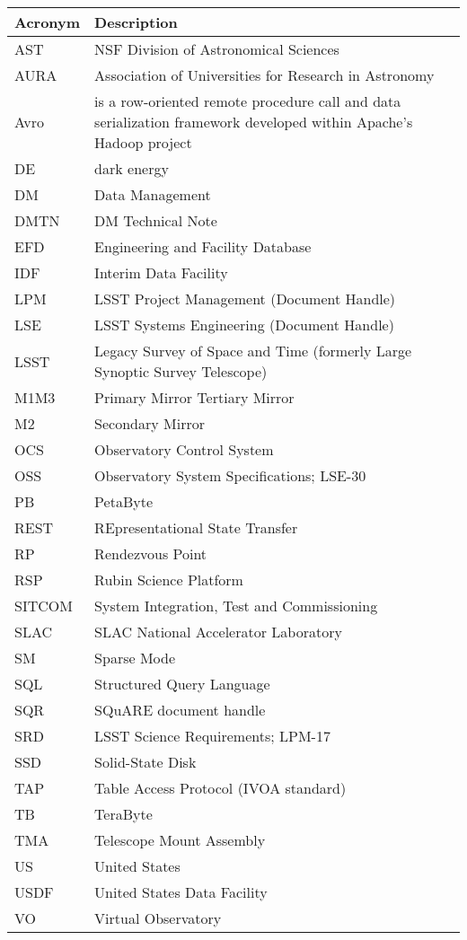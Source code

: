 \addtocounter{table}{-1}
\begin{longtable}{p{}p{}}\hline
\textbf{Acronym} & \textbf{Description}  \\\hline

AST & NSF Division of Astronomical Sciences \\\hline
AURA & Association of Universities for Research in Astronomy \\\hline
Avro & is a row-oriented remote procedure call and data serialization framework developed within Apache's Hadoop project \\\hline
DE & dark energy \\\hline
DM & Data Management \\\hline
DMTN & DM Technical Note \\\hline
EFD & Engineering and Facility Database \\\hline
IDF & Interim Data Facility \\\hline
LPM & LSST Project Management (Document Handle) \\\hline
LSE & LSST Systems Engineering (Document Handle) \\\hline
LSST & Legacy Survey of Space and Time (formerly Large Synoptic Survey Telescope) \\\hline
M1M3 & Primary Mirror Tertiary Mirror \\\hline
M2 & Secondary Mirror \\\hline
OCS & Observatory Control System \\\hline
OSS & Observatory System Specifications; LSE-30 \\\hline
PB & PetaByte \\\hline
REST & REpresentational State Transfer \\\hline
RP & Rendezvous Point \\\hline
RSP & Rubin Science Platform \\\hline
SITCOM & System Integration, Test and Commissioning \\\hline
SLAC & SLAC National Accelerator Laboratory \\\hline
SM & Sparse Mode \\\hline
SQL & Structured Query Language \\\hline
SQR & SQuARE document handle \\\hline
SRD & LSST Science Requirements; LPM-17 \\\hline
SSD & Solid-State Disk \\\hline
TAP & Table Access Protocol (IVOA standard) \\\hline
TB & TeraByte \\\hline
TMA & Telescope Mount Assembly \\\hline
US & United States \\\hline
USDF & United States Data Facility \\\hline
VO & Virtual Observatory \\\hline
\end{longtable}
